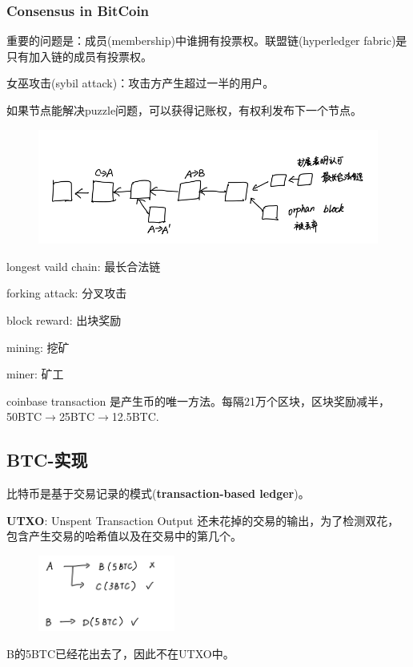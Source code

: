 \documentclass[10pt]{ctexart}
\begin{document}
\subsubsection{Consensus in BitCoin}
重要的问题是：成员(membership)中谁拥有投票权。联盟链(hyperledger fabric)是只有加入链的成员有投票权。

女巫攻击(sybil attack)：攻击方产生超过一半的用户。

如果节点能解决puzzle问题，可以获得记账权，有权利发布下一个节点。
\begin{figure}[H]
    \centering
    \includegraphics[width=1\textwidth]{courses/区块链技术与应用/lecture4/img7.png} 
\end{figure}
longest vaild chain: 最长合法链

forking attack: 分叉攻击

block reward: 出块奖励

mining: 挖矿

miner: 矿工

coinbase transaction 是产生币的唯一方法。每隔21万个区块，区块奖励减半，50BTC$\rightarrow$25BTC$\rightarrow$12.5BTC.
\subsection{BTC-实现}
比特币是基于交易记录的模式(\textbf{transaction-based ledger})。

\textbf{UTXO}: Unspent Transaction Output 还未花掉的交易的输出，为了检测双花，包含产生交易的哈希值以及在交易中的第几个。
\begin{figure}[H]
    \centering
    \includegraphics[width=0.4\textwidth]{courses/区块链技术与应用/lecture5/img1.png} 
\end{figure}
B的5BTC已经花出去了，因此不在UTXO中。
\end{document}
